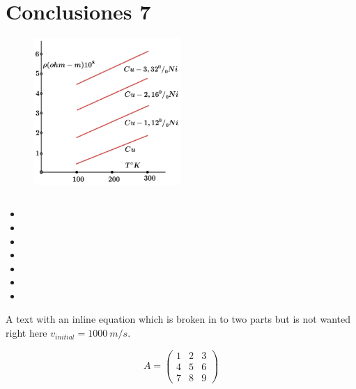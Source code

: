 
\chapter{Conclusiones 7} %

\label{Chapter7} %




\begin{figure}[H]
    \centering
    \includegraphics[width=0.5\textwidth]{./Figures/fig42}
	\caption{}
	\label{fig:42x}
\end{figure}

\begin{equation}
\end{equation}

\begin{itemize}
	\item 
	\item 
	\item 
	\item 
	\item 
	\item 
	\item 
\end{itemize}

\begin{sloppypar}
A text with an inline equation which is broken in to two parts
but is not wanted right here ${v_{initial} = \SI{1000}{m/s}}$.
\end{sloppypar}

\begin{equation}
A = 
\begin{pmatrix}
1 & 2 & 3 \\
4 & 5 & 6 \\
7 & 8 & 9
\end{pmatrix}
\end{equation}

